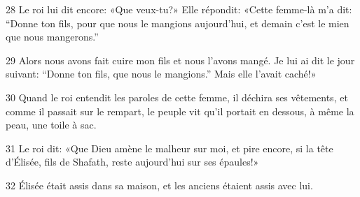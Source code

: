 
28 Le roi lui dit encore: «Que veux-tu?» Elle répondit: «Cette femme-là m’a dit: “Donne ton fils, pour que nous le mangions aujourd’hui, et demain c’est le mien que nous mangerons.”

29 Alors nous avons fait cuire mon fils et nous l’avons mangé. Je lui ai dit le jour suivant: “Donne ton fils, que nous le mangions.” Mais elle l’avait caché!»

30 Quand le roi entendit les paroles de cette femme, il déchira ses vêtements, et comme il passait sur le rempart, le peuple vit qu’il portait en dessous, à même la peau, une toile à sac.

31 Le roi dit: «Que Dieu amène le malheur sur moi, et pire encore, si la tête d’Élisée, fils de Shafath, reste aujourd’hui sur ses épaules!»

32 Élisée était assis dans sa maison, et les anciens étaient assis avec lui. 